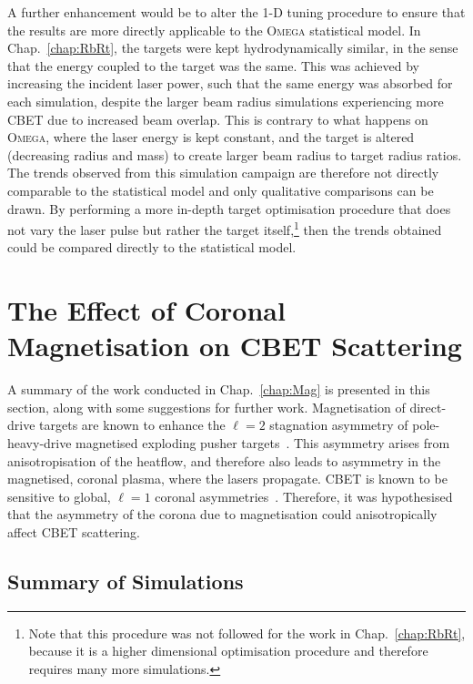 A further enhancement would be to alter the 1-D tuning procedure to ensure that the results are more directly applicable to the \textsc{Omega} statistical model.
In Chap.~\ref{chap:RbRt}, the targets were kept hydrodynamically similar, in the sense that the energy coupled to the target was the same.
This was achieved by increasing the incident laser power, such that the same energy was absorbed for each simulation, despite the larger beam radius simulations experiencing more \ac{CBET} due to increased beam overlap.
This is contrary to what happens on \textsc{Omega}, where the laser energy is kept constant, and the target is altered (decreasing radius and mass) to create larger beam radius to target radius ratios.
The trends observed from this simulation campaign are therefore not directly comparable to the statistical model and only qualitative comparisons can be drawn.
By performing a more in-depth target optimisation procedure that does not vary the laser pulse but rather the target itself,\footnote{Note that this procedure was not followed for the work in Chap.~\ref{chap:RbRt}, because it is a higher dimensional optimisation procedure and therefore requires many more simulations.} then the trends obtained could be compared directly to the statistical model.

\section{The Effect of Coronal Magnetisation on CBET Scattering}

A summary of the work conducted in Chap.~\ref{chap:Mag} is presented in this section, along with some suggestions for further work.
Magnetisation of direct-drive targets are known to enhance the $\ell=2$ stagnation asymmetry of pole-heavy-drive magnetised exploding pusher targets~\cite{bose_effect_2022}.
This asymmetry arises from anisotropisation of the heatflow, and therefore also leads to asymmetry in the magnetised, coronal plasma, where the lasers propagate.
\ac{CBET} is known to be sensitive to global, $\ell=1$ coronal asymmetries~\cite{colaitis_inverse_2021}.
Therefore, it was hypothesised that the asymmetry of the corona due to magnetisation could anisotropically affect \ac{CBET} scattering.

\subsection{Summary of Simulations}

